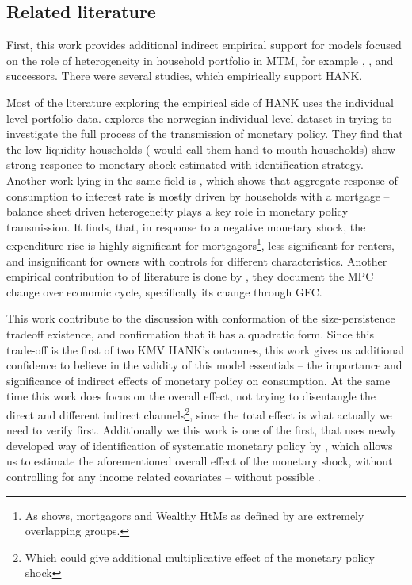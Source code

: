 \documentclass[12pt]{article}
\numberwithin{equation}{section}
\begin{document}
\subsection{Related literature}


First, this work provides additional indirect empirical support for models focused on the role of heterogeneity in household portfolio in MTM, for example \citet{KMV2018}, \citet{Auclert2019}, \citet{Luetticke2021} and successors.
There were several studies, which empirically support HANK. 

Most of the literature exploring the empirical side of HANK uses the individual level portfolio data. \citet{HolmPaulTischbirek2020} explores the norwegian individual-level dataset in trying to investigate the full process of the transmission of monetary policy.
They find that the low-liquidity households (\citeauthor{KMV2018} would call them hand-to-mouth households) show strong responce to monetary shock estimated with \cite{RomerRomer2004} identification strategy.
Another work lying in the same field is \citet{Cloyne2019}, which  shows that aggregate response of consumption to interest rate is mostly driven by households with a mortgage -- balance sheet driven heterogeneity plays a key role in monetary policy transmission.
It finds, that, in response to a negative monetary shock, the expenditure rise is highly significant for mortgagors\footnote{As \citet{Cloyne2019} shows, mortgagors and Wealthy HtMs as defined by \citet{KVW2014} are extremely overlapping groups.}, less significant for renters, and insignificant for owners with controls for different characteristics.
Another empirical contribution to of literature is done by \citet{Gross2020}, they document the MPC change over economic cycle, specifically its change through GFC.



This work contribute to the discussion with conformation of the size-persistence tradeoff existence, and confirmation that it has a quadratic form.
Since this trade-off is the first of two KMV HANK's outcomes, this work gives us additional confidence to believe in the validity of this model essentials -- the importance and significance of indirect effects of monetary policy on consumption.
At the same time this work does focus on the overall effect, not trying to disentangle the direct and different indirect channels\footnote{Which could give additional multiplicative effect of the monetary policy shock}, since the total effect is what actually we need to verify first.
Additionally we this work is one of the first, that uses newly developed way of identification of systematic monetary policy  by , which allows us to estimate the aforementioned overall effect of the monetary shock, without controlling for any income related covariates -- without possible .
\end{document}
